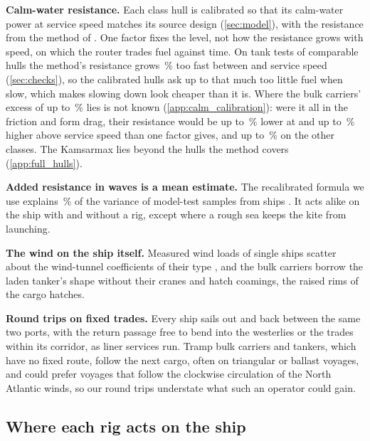 \textbf{Calm-water resistance.} Each class hull is calibrated so that its calm-water power at service speed matches its source design (\cref{sec:model}), with the resistance from the method of \citet{holtrop1982}. One factor fixes the level, not how the resistance grows with speed, on which the router trades fuel against time. On tank tests of comparable hulls the method's resistance grows \,\% too fast between  and service speed (\cref{sec:checks}), so the calibrated hulls ask up to that much too little fuel when slow, which makes slowing down look cheaper than it is. Where the bulk carriers' excess of up to \,\% lies is not known (\cref{app:calm_calibration}): were it all in the friction and form drag, their resistance would be up to \,\% lower at  and up to \,\% higher  above service speed than one factor gives, and up to \,\% on the other classes. The Kamsarmax lies beyond the hulls the method covers (\cref{app:full_hulls}).

\textbf{Added resistance in waves is a mean estimate.} The recalibrated formula we use explains \,\% of the variance of  model-test samples from  ships \citep{mittendorf2022}. It acts alike on the ship with and without a rig, except where a rough sea keeps the kite from launching.

\textbf{The wind on the ship itself.} Measured wind loads of single ships scatter about the wind-tunnel coefficients of their type \citep{blendermann1993}, and the bulk carriers borrow the laden tanker's shape without their cranes and hatch coamings, the raised rims of the cargo hatches. 

\textbf{Round trips on fixed trades.} Every ship sails out and back between the same two ports, with the return passage free to bend into the westerlies or the trades within its corridor, as liner services run. Tramp bulk carriers and tankers, which have no fixed route, follow the next cargo, often on triangular or ballast voyages, and could prefer voyages that follow the clockwise circulation of the North Atlantic winds, so our round trips understate what such an operator could gain.

\subsection{Where each rig acts on the ship}
\label{sec:tow_point}

